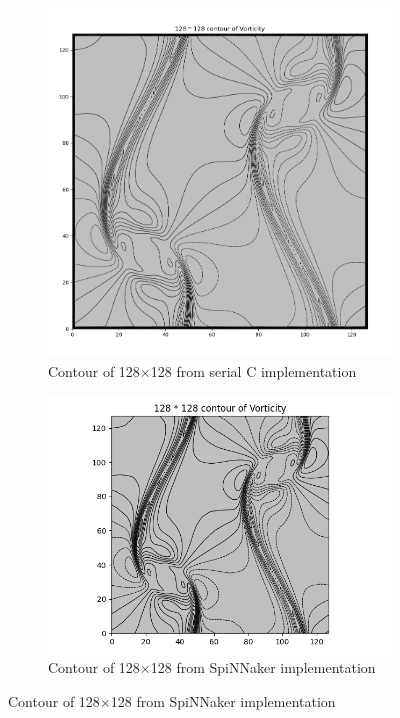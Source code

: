 \begin{figure}[htbp]
\medskip
\begin{subfigure}{0.43\textwidth}
\includegraphics[width=\linewidth]{figures/double_c_128.png}
\caption{Contour of 128$\times$128 from serial C implementation} \label{fig:c}
\end{subfigure}\hspace*{\fill}
\begin{subfigure}{0.57\textwidth}
\includegraphics[width=\linewidth]{figures/spinnaker_128.png}
\caption{Contour of 128$\times$128 from SpiNNaker implementation} \label{fig:d}
\end{subfigure}


\end{figure}
